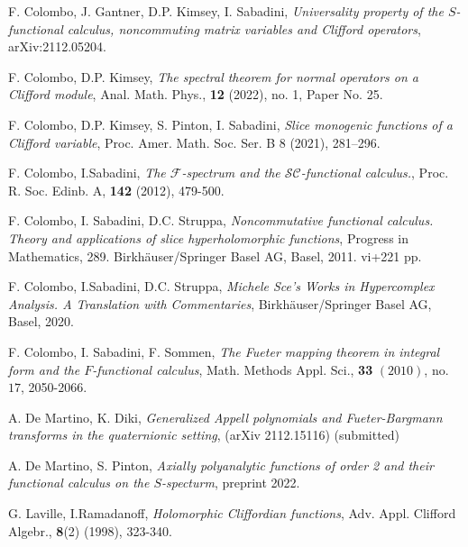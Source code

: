 \documentclass[reqno,11pt]{amsart}
\numberwithin{equation}{section}
\theoremstyle{definition}
\begin{document}
\begin{thebibliography}{99}
F. Colombo, J. Gantner, D.P. Kimsey, I. Sabadini,
{\em Universality property of the $S$-functional
calculus, noncommuting matrix variables and Clifford operators}, arXiv:2112.05204.

F. Colombo, D.P. Kimsey,
{\em The spectral theorem for normal operators on a Clifford module},
  Anal. Math. Phys., {\bf 12} (2022), no. 1, Paper No. 25.


F. Colombo, D.P. Kimsey, S. Pinton, I. Sabadini,
{ \em  Slice monogenic functions of a Clifford variable},
Proc. Amer. Math. Soc. Ser. B 8 (2021), 281--296.



 F. Colombo, I.Sabadini, \emph{The $\mathcal F$-spectrum and the $\mathcal{SC}$-functional calculus.}, Proc. R. Soc. Edinb. A, {\bf 142} (2012), 479-500.


 F. Colombo, I. Sabadini, D.C. Struppa, {\em Noncommutative functional calculus. Theory and applications of slice hyperholomorphic functions},
     Progress in Mathematics, 289. Birkh\"auser/Springer Basel AG, Basel, 2011. vi+221 pp.

 F. Colombo, I.Sabadini, D.C. Struppa, \emph{Michele Sce's Works in Hypercomplex Analysis. A Translation with Commentaries}, Birkhäuser/Springer Basel AG, Basel, 2020.

 F. Colombo, I. Sabadini, F. Sommen, \emph{The Fueter mapping theorem in integral form and the $F$-functional calculus}, Math. Methods Appl. Sci., \textbf{33} $(2010)$, no. $17$, 2050-2066.

 A. De Martino, K. Diki, \emph{Generalized Appell polynomials and Fueter-Bargmann transforms in the quaternionic setting}, (arXiv 2112.15116) (submitted)


  A. De Martino, S. Pinton,  \emph{Axially polyanalytic functions of order 2 and their functional calculus on the $S$-specturm}, preprint 2022.


 G. Laville, I.Ramadanoff, \emph{Holomorphic Cliffordian functions}, Adv. Appl. Clifford Algebr., \textbf{8}(2)	 (1998), 323-340.






\end{thebibliography}
\end{document}
